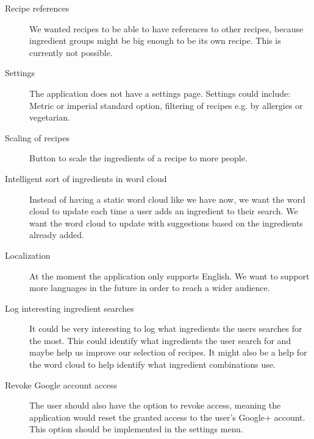 \begin{description}
\item[Recipe references] We wanted recipes to be able to have references to other recipes, because ingredient groups might be big enough to be its own recipe. This is currently not possible.

\item[Settings] The application does not have a settings page. Settings could include: Metric or imperial standard option, filtering of recipes e.g. by allergies or vegetarian.

\item[Scaling of recipes] Button to scale the ingredients of a recipe to more people.

\item [Intelligent sort of ingredients in word cloud] Instead of having a static word cloud like we have now, we want the word cloud to update each time a user adds an ingredient to their search. We want the word cloud to update with suggestions based on the ingredients already added. 

\item [Localization] At the moment the application only supports English. We want to support more languages in the future in order to reach a wider audience.
\item [Log interesting ingredient searches] It could be very interesting to log what ingredients the users searches for the most. This could identify what ingredients the user search for and maybe help us improve our selection of recipes. It might also be a help for the word cloud to help identify what ingredient combinations use.
\item [Revoke Google account access]
The user should also have the option to revoke access, meaning the application would reset the granted access to the user's Google+ account.
This option should be implemented in the settings menu.
\end{description}
